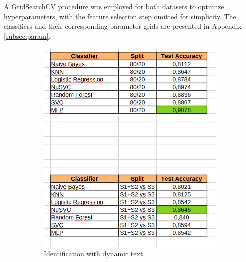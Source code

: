 \documentclass{article}
\begin{document}
A GridSearchCV procedure was employed for both datasets to optimize hyperparameters, with the feature selection step omitted for simplicity.
The classifiers and their corresponding parameter grids are presented in Appendix \ref{subsec:param}.

\begin{figure}[htbp]
    \centering
    \begin{subfigure}[t]{0.49\textwidth}
        \centering
        \includegraphics[width=\linewidth]{Images/Results/Static_Dynamic/id_moving.png}
        \caption{Identification with dynamic text}
        \label{fig:dyn_id}
    \end{subfigure}
    \hfill
    \begin{subfigure}[t]{0.49\textwidth}
        \centering

\end{subfigure}
\end{figure}
\end{document}
